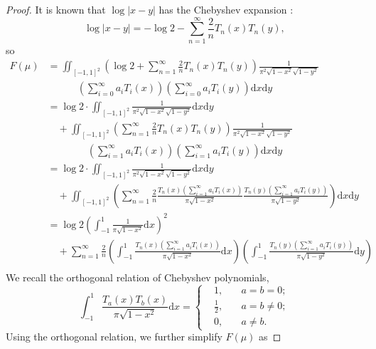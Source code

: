 \documentclass{article} %
\begin{document}
\begin{proof}
    It is known that $\log |x-y|$ has the Chebyshev expansion \citep{SloanStephan1992,MasonHandscomb2002}:
    \[ \log |x-y| = -\log 2 - \sum_{n=1}^{\infty} \frac{2}{n} T_n(x) T_n(y),\]
    so
    \[
    \begin{aligned}
        F(\mu) &= \iint_{[-1,1]^2} \left( \log 2 + 
        \sum_{n=1}^{\infty}\frac 2 n T_n(x) T_n(y) \right) \frac{1}{\pi^2 \sqrt{1-x^2}\sqrt{1-y^2}} \\
        &\quad \quad \quad \left(\sum_{i=0}^{\infty} a_i T_i(x)\right) \left(\sum_{i=0}^{\infty} a_i T_i(y)\right) \mathrm{d} x \mathrm{d}y \\
        &= \log 2 \cdot \iint_{[-1,1]^2} \frac{1}{\pi^2 \sqrt{1-x^2}\sqrt{1-y^2}} \mathrm{d} x \mathrm{d}y \\
        &\quad + \iint_{[-1,1]^2} \left(
        \sum_{n=1}^{\infty}\frac 2 n T_n(x) T_n(y) \right) \frac{1}{\pi^2 \sqrt{1-x^2}\sqrt{1-y^2}} \\
        &\quad \quad \quad \quad \left(\sum_{i=1}^{\infty} a_i T_i(x)\right) \left(\sum_{i=1}^{\infty} a_i T_i(y)\right) \mathrm{d}x \mathrm{d}y \\
        &= \log 2 \cdot \iint_{[-1,1]^2} \frac{1}{\pi^2 \sqrt{1-x^2}\sqrt{1-y^2}} \mathrm{d} x \mathrm{d}y \\
        &\quad + \iint_{[-1,1]^2} \left(\sum_{n=1}^{\infty}\frac 2 n \frac{T_n(x)\left(\sum_{i=1}^{\infty} a_i T_i(x)\right)}{\pi \sqrt{1-x^2}} \frac{T_n(y)\left(\sum_{i=1}^{\infty} a_i T_i(y)\right)}{\pi \sqrt{1-y^2}} \right) \mathrm{d}x \mathrm{d}y \\
        &= \log 2 \left(\int_{-1}^{1} \frac{1}{\pi \sqrt{1-x^2}} \mathrm{d} x\right)^2 \\
        &\quad + \sum_{n=1}^{\infty}\frac 2 n \left(\int_{-1}^{1} \frac{T_n(x)\left(\sum_{i=1}^{\infty} a_i T_i(x)\right)}{\pi \sqrt{1-x^2}} \mathrm{d}x \right) \left(\int_{-1}^{1} \frac{T_n(y)\left(\sum_{i=1}^{\infty} a_i T_i(y)\right)}{\pi \sqrt{1-y^2}} \mathrm{d}y \right)  \\
    \end{aligned}
    \]
    We recall the orthogonal relation of Chebyshev polynomials, 
    \[
    \int_{-1}^{1} \frac{T_a(x) T_b(x)}{\pi \sqrt{1-x^2}} \mathrm{d} x = 
    \left\{
    \begin{aligned}
        &1, \quad &a=b=0; \\
        &\frac{1}{2}, \quad &a=b\ne 0; \\
        &0, \quad &a\ne b.
    \end{aligned}
    \right.
    \]
    Using the orthogonal relation, we further simplify $F(\mu)$ as

\end{proof}
\end{document}
